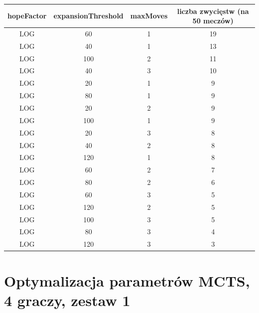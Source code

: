 \documentclass{pracamgr}
\begin{document}
\begin{appendices}
\begin{center}
    \begin{tabular}{| c | c | c | c |}
	\hline
    hopeFactor & expansionThreshold & maxMoves & liczba zwycięstw (na 50 meczów) \\ \hline
	\hline

        LOG & 60 & 1 & 19 \\ \hline
        LOG & 40 & 1 & 13 \\ \hline
        LOG & 100 & 2 & 11 \\ \hline
        LOG & 40 & 3 & 10 \\ \hline
        LOG & 20 & 1 & 9 \\ \hline
        LOG & 80 & 1 & 9 \\ \hline
        LOG & 20 & 2 & 9 \\ \hline
        LOG & 100 & 1 & 9 \\ \hline
        LOG & 20 & 3 & 8 \\ \hline
        LOG & 40 & 2 & 8 \\ \hline
        LOG & 120 & 1 & 8 \\ \hline
        LOG & 60 & 2 & 7 \\ \hline
        LOG & 80 & 2 & 6 \\ \hline
        LOG & 60 & 3 & 5 \\ \hline
        LOG & 120 & 2 & 5 \\ \hline
        LOG & 100 & 3 & 5 \\ \hline
        LOG & 80 & 3 & 4 \\ \hline
        LOG & 120 & 3 & 3 \\ \hline

    \end{tabular}
\end{center}

\vfill
\hspace{0pt}
\pagebreak

\section{Optymalizacja parametrów MCTS, 4 graczy, zestaw 1\label{results-1-4p}}


\end{appendices}
\end{document}
